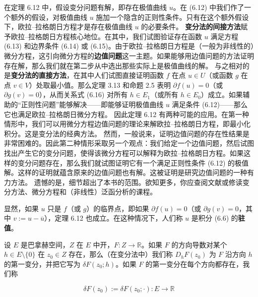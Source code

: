 \begin{remark}

\begin{items}
\item

在定理 6.12 中，假设变分问题有解，即存在极值曲线 $ u $。在 (6.12) 中我们作了一个额外的假设，对极值曲线 $ u $ 施加一个隐含的正则性条件。只有在这个额外假设下，欧拉–拉格朗日方程才是存在极值曲线 $ u $ 的必要条件。
\textbf{变分法的间接方法}赋予欧拉–拉格朗日方程核心地位。在其中，我们试图验证存在函数 $ u $ 满足方程 (6.13) 和边界条件 (6.14) 或 (6.15)。由于欧拉–拉格朗日方程是（一般为非线性的）微分方程，这引向微分方程的\textbf{边值问题}这一主题。如果能够用边值问题的方法证明存在解，那么我们就在第二步从中选出那些实际上是极值曲线的解。
与之相对的是\textbf{变分法的直接方法}，在其中人们试图直接证明函数 $ f $ 在点 $ u \in U $（或函数 $ g $ 在点 $ v \in V $）处取最小值。那么定理 3.13 和命题 2.5 表明 $ \partial f(u) = 0 $（或 $ \partial g(v) = 0 $），从而关系式 (6.16) 对所有 $ h \in E_{1} $（或所有 $ h \in E_{0} $）成立。如果辅助的“正则性问题”能够解决——即能够证明极值曲线 $ u $ 满足条件 (6.12)——那么它也满足欧拉–拉格朗日微分方程。
因此定理 6.12 有两种可能的应用。在第一种情形中，我们可以用微分方程边值问题的理论来解欧拉–拉格朗日方程，即最小化积分。这是变分法的经典方法。
然而，一般说来，证明边值问题的存在性结果是非常困难的。因此第二种情形采取另一个观点：我们给定一个边值问题，然后试图找出产生它的变分问题，使得该微分方程可以解释为欧拉–拉格朗日方程。如果这样的变分问题存在，那么我们就试图证明它有一个满足正则性条件 (6.12) 的极值解。这样的证明就蕴含原来的边值问题也有解。这被证明是研究边值问题的一种有力方法。
遗憾的是，细节超出了本书的范围。欲知更多，你应查阅文献或修读变分方法、微分方程和（非线性）泛函分析的课程。

\item

显然，如果 $ u $ 只是 $ f $（或 $ g $）的临界点，即如果 $ \partial f(u) = 0 $（或 $ \partial g(v) = 0 $，其中 $ v := u - \overline{u} $），定理 6.12 也成立。在这种情况下，人们称 $ u $ 是积分 (6.6) 的\textbf{驻值}。

\item

设 $ E $ 是巴拿赫空间，$ Z $ 在 $ E $ 中开，$ F : Z \to \mathbb{R} $。如果 $ F $ 的方向导数对某个 $ h \in E \setminus \{0\} $ 在 $ z_{0} \in Z $ 存在，那么（在变分法中）我们称 $ D_{h}F(z_{0}) $ 为 $ F $ 沿方向 $ h $ 的第一变分，并把它写为 $ \delta F(z_{0}; h) $。如果 $ F $ 的第一变分在每个方向都存在，我们称

\[
\delta F(z_{0}) := \delta F(z_{0}; \cdot) : E \to \mathbb{R}
\]


\end{items}
\end{remark}

